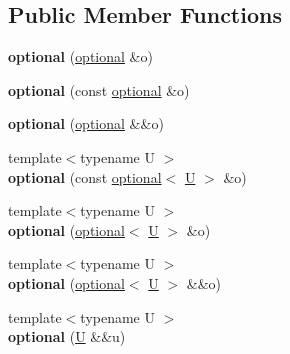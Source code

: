 \subsection*{Public Member Functions}
\begin{DoxyCompactItemize}
\item 
\mbox{\label{classaacio_1_1optional_aa261f79c69f50322b9dfd928663c71c1}} 
{\bfseries optional} (\mbox{\hyperlink{classaacio_1_1optional}{optional}} \&o)
\item 
\mbox{\label{classaacio_1_1optional_af4d8f6e828d0ed31cd949005ab66782d}} 
{\bfseries optional} (const \mbox{\hyperlink{classaacio_1_1optional}{optional}} \&o)
\item 
\mbox{\label{classaacio_1_1optional_aab01f24182a424b82c680548304ea2fd}} 
{\bfseries optional} (\mbox{\hyperlink{classaacio_1_1optional}{optional}} \&\&o)
\item 
\mbox{\label{classaacio_1_1optional_ac7ccf40d6bd5fc16b80673383287f179}} 
{\footnotesize template$<$typename U $>$ }\\{\bfseries optional} (const \mbox{\hyperlink{classaacio_1_1optional}{optional}}$<$ \mbox{\hyperlink{union_u}{U}} $>$ \&o)
\item 
\mbox{\label{classaacio_1_1optional_a922e971c529dcc842aade6f002a48b91}} 
{\footnotesize template$<$typename U $>$ }\\{\bfseries optional} (\mbox{\hyperlink{classaacio_1_1optional}{optional}}$<$ \mbox{\hyperlink{union_u}{U}} $>$ \&o)
\item 
\mbox{\label{classaacio_1_1optional_a5591c672161f66af82533320c99eeebb}} 
{\footnotesize template$<$typename U $>$ }\\{\bfseries optional} (\mbox{\hyperlink{classaacio_1_1optional}{optional}}$<$ \mbox{\hyperlink{union_u}{U}} $>$ \&\&o)
\item 
\mbox{\label{classaacio_1_1optional_a1fa7443515bdd493ce5bc37320e332dd}} 
{\footnotesize template$<$typename U $>$ }\\{\bfseries optional} (\mbox{\hyperlink{union_u}{U}} \&\&u)
\item 

\end{DoxyCompactItemize}
